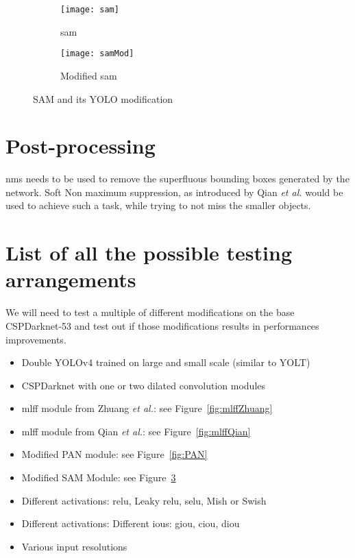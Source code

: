 \begin{figure}[H]
	\centering
	\begin{subfigure}[b]{0.4\textwidth}
		\centering
		\texttt{[image: sam]}
		\caption{\gls{sam}}
		\label{fig:samnorm}
	\end{subfigure}
	\begin{subfigure}[b]{0.4\textwidth}
		\centering
		\texttt{[image: samMod]}
		\caption{Modified \gls{sam}}
		\label{fig:samod}
	\end{subfigure}
	\caption{SAM and its YOLO modification}
	\label{fig:SAM}
\end{figure}

\section{Post-processing}
\gls{nms} needs to be used to remove the superfluous bounding boxes generated by the network. Soft Non maximum suppression, as introduced by Qian \textit{et al.} \cite{qianAl} would be used to achieve such a task, while trying to not miss the smaller objects.


\section{List of all the possible testing arrangements}
We will need to test a multiple of different modifications on the base CSPDarknet-53 and test out if those modifications results in performances improvements.
\begin{itemize}
	\item Double YOLOv4 trained on large and small scale (similar to YOLT\cite{yolt})
	\item CSPDarknet with one or two dilated convolution modules
	\item \gls{mlff} module from Zhuang \textit{et al.}: see Figure~\ref{fig:mlffZhuang}
	\item \gls{mlff} module from Qian \textit{et al.}: see Figure~\ref{fig:mlffQian}
	\item Modified PAN module: see Figure~\ref{fig:PAN}
	\item Modified SAM Module: see Figure~\ref{fig:SAM}
	\item Different activations: \gls{relu}, Leaky \gls{relu}, \gls{selu}, Mish or Swish
	\item Different activations: Different \glspl{iou}: \gls{giou}, \gls{ciou}, \gls{diou} 
	\item Various input resolutions 
\end{itemize}


